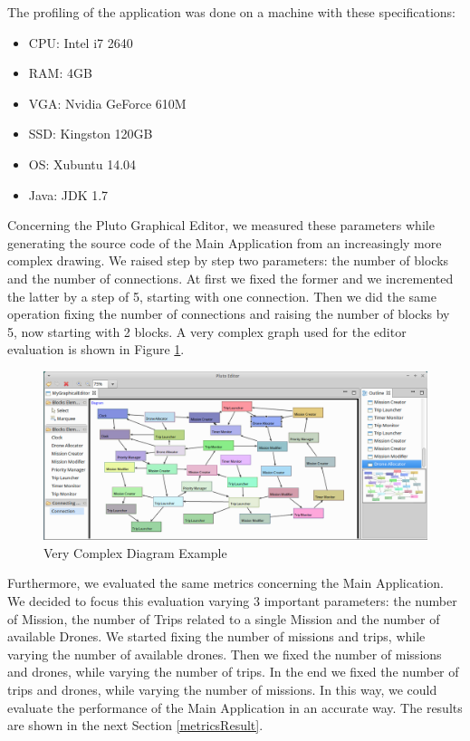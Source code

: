 The profiling of the application was done on a machine with these specifications:

\begin{itemize}
\item CPU: Intel i7 2640
\item RAM: 4GB
\item VGA: Nvidia GeForce 610M
\item SSD: Kingston 120GB
\item OS: Xubuntu 14.04
\item Java: JDK 1.7
\end{itemize}

Concerning the Pluto Graphical Editor, we measured these parameters while generating the source code of the Main Application from an increasingly more complex drawing. 
We raised step by step two parameters: the number of blocks and the number of connections.
At first we fixed the former and we incremented the latter by a step of 5, starting with one connection. Then we did the same operation fixing the number of connections and raising the number of blocks by 5, now starting with 2 blocks.
A very complex graph used for the editor evaluation is shown in Figure \ref{fig:stressDiagram}.

\begin{figure}[H]
  \centering
  \includegraphics[width=\linewidth]{pictures/stressDiagram.png}
  \caption{Very Complex Diagram Example}
  \label{fig:stressDiagram}
\end{figure}

Furthermore, we evaluated the same metrics concerning the Main Application.
We decided to focus this evaluation varying 3 important parameters: the number of Mission, the number of Trips related to a single Mission and the number of available Drones. 
We started fixing the number of missions and trips, while varying the number of available drones. 
Then we fixed the number of missions and drones, while varying the number of trips. 
In the end we fixed the number of trips and drones, while varying the number of missions.
In this way, we could evaluate the performance of the Main Application in an accurate way.
The results are shown in the next Section \ref{metricsResult}.

